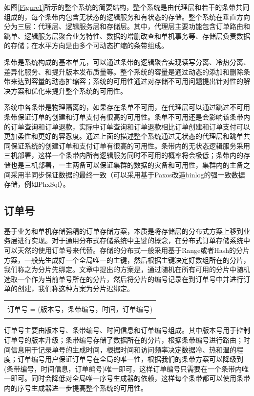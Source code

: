 \documentclass[letterpaper,twocolumn,10pt]{article}
\begin{document}
如图\ref{Figure1}所示的整个系统的简要结构，整个系统是由代理层和若干的条带共同组成的，每个条带内包含无状态的逻辑服务和有状态的存储。整个系统在垂直方向分为三层：代理层、逻辑服务层和存储层。其中，代理层主要功能包含订单路由和跳单、逻辑服务层聚合业务特性、数据的增删改查和单机事务等、存储层负责数据的存储；在水平方向是由多个可动态扩缩的条带组成。

条带是系统构成的基本单元，可以通过条带的逻辑聚合实现读写分离、冷热分离、差异化服务、和提升版本发布质量等。整个系统的容量是通过动态的添加和删除条带来达到容量的动态扩缩容；系统的可用性通过对存储不可用问题提出针对性的解决方案和优化来提升整个系统的可用性。

系统中各条带是物理隔离的，如果存在条单不可用，在代理层可以通过跳过不可用条带保证订单的创建和订单支付有很高的可用性。条单不可用还是会影响该条带内的订单查询和订单退款，实际中订单查询和订单退款相比订单创建和订单支付可以更加柔性和更好的容忍度。通过上面的描述整个系统通过无状态的代理层和跳单共同保证系统的创建订单和支付订单有很高的可用性。条带内的无状态逻辑服务采用三机部署，这样一个条带内所有逻辑服务同时不可用的概率将会极低；条带内的存储也是三机部署，一主两备可以保证集群的数据的灾备和可用性，集群内的主备之间采用半同步保证数据的最终一致（可以采用基于Paxos改造binlog的强一致数据存储，例如PhxSql）。


\subsection{订单号}
基于业务和单机存储强耦的订单存储方案，本质是将存储层的分布式方案上移到业务层进行实现。对于通用分布式存储系统中主键的概念，在分布式订单存储系统中可以天然的使用订单号来代替。存储的分布式一般采用基于Range或者Hash的分片方案，一般先生成好一个全局唯一的主键，然后根据主键决定好数组所在的分片，我们称之为分片先绑定。文章中提出的方案是，通过随机在所有可用的分片中随机选取一个作为当前单号所在的分片，然后将分片的编号记录在到订单号中并进行订单的创建，我们称这种方案为分片迟绑定。

\begin{table}[htp]
\begin{center}
\begin{tabular}{c}
\hline
\hline
\\
订单号 = (版本号，条带编号，时间，订单编号) \\
\\
\hline
\hline
\end{tabular}
\end{center}
\label{default}
\end{table}%

订单号主要由版本号、条带编号、时间信息和订单编号组成。其中版本号用于控制订单号的版本升级；条带编号存储了数据所在的分片，根据条带编号进行路由；时间信息用于记录单号的生成时间，根据时间和访问频率决定数据冷、热和温的程度；订单编号用户保证订单号在全局的唯一性，根据我们的条带方案可以降级到(条带编号，时间信息，订单编号)唯一即可，这样订单编号只需要在一个条带内唯一即可。同时会降低对全局唯一序号生成器的依赖，这样每个条带都可以使用条带内的序号生成器进一步提高整个系统的可用性。
\end{document}
